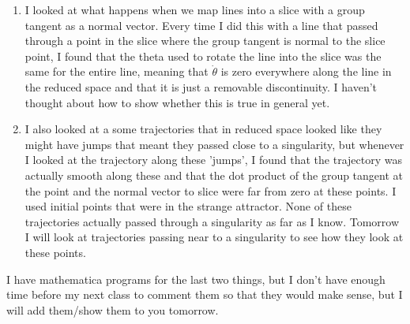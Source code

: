 \begin{description}
\begin{enumerate}
\item
I looked at what happens when we map lines into a slice with a group tangent as a normal vector. Every time I did this with a line that passed through a point in the slice where the group tangent is normal to the slice point, I found that the theta used to rotate the line into the slice was the same for the entire line, meaning that $\dot \theta$ is zero everywhere along the line in the reduced space and that it is just a removable discontinuity. I haven't thought about how to show whether this is true in general yet.

\item
I also looked at a some trajectories that in reduced space looked like they might have jumps that meant they passed close to a singularity, but whenever I looked at the trajectory along these 'jumps', I found that the trajectory was actually smooth along these and that the dot product of the group tangent at the point and the normal vector to slice were far from zero at these points. I used initial points that were in the strange attractor. None of these trajectories actually passed through a singularity as far as I know. Tomorrow I will look at trajectories passing near to a singularity to see how they look at these points.

\end{enumerate}

I have mathematica programs for the last two things, but I don't have enough time before my next class to comment them so that they would make sense, but I will add them/show them to you tomorrow.

\end{description}
